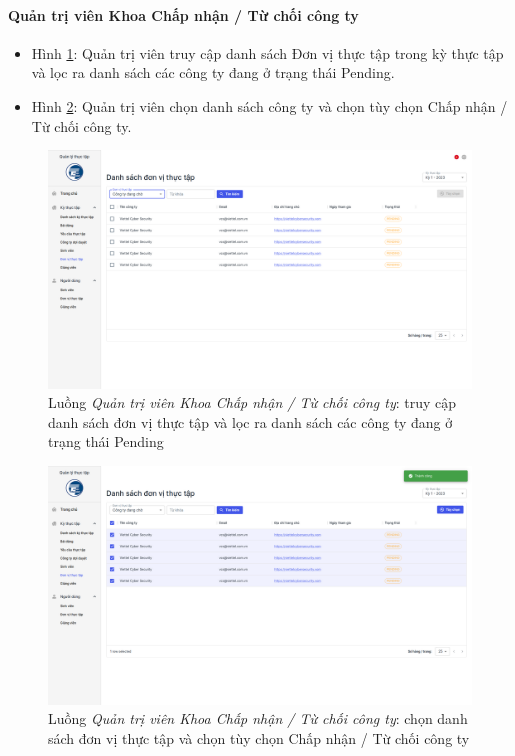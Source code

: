 \documentclass[./../main.tex]{subfiles}
\begin{document}
\paragraph*{Quản trị viên Khoa Chấp nhận / Từ chối công ty}

\begin{itemize}
	\item Hình \ref{fig:org_admin_access_list_intern_partners}: Quản trị viên truy cập danh sách Đơn vị thực tập trong kỳ thực tập và lọc ra danh sách các công ty đang ở trạng thái Pending.
	\item Hình \ref{fig:org_admin_select_partners}: Quản trị viên chọn danh sách công ty và chọn tùy chọn Chấp nhận / Từ chối công ty.
\end{itemize}

\begin{figure}[]
	\includegraphics[width=\linewidth]{./images/image79.png}
	\caption{Luồng \emph{Quản trị viên Khoa Chấp nhận / Từ chối công ty}: truy cập danh sách đơn vị thực tập và lọc ra danh sách các công ty đang ở trạng thái Pending}
	\label{fig:org_admin_access_list_intern_partners}
\end{figure}

\begin{figure}[]
	\includegraphics[width=\linewidth]{./images/image80.png}
	\caption{Luồng \emph{Quản trị viên Khoa Chấp nhận / Từ chối công ty}: chọn danh sách đơn vị thực tập và chọn tùy chọn Chấp nhận / Từ chối công ty}
	\label{fig:org_admin_select_partners}
\end{figure}
\end{document}
